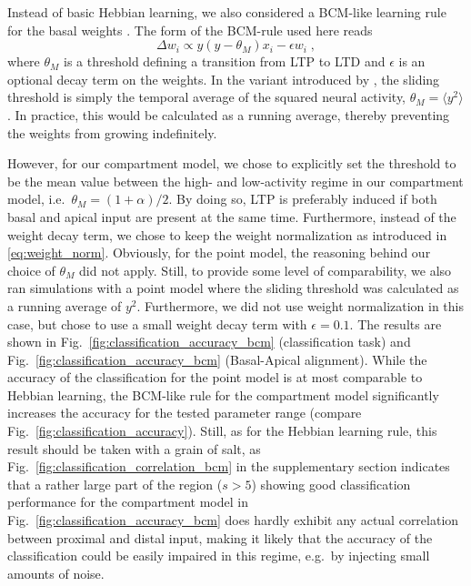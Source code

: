 \documentclass[utf8]{frontiersSCNS} %
\begin{document}
Instead of basic Hebbian learning, we also considered 
a BCM-like learning rule for the basal weights 
\citep{Bienenstock1982,Intrator1992}.
The form of the BCM-rule used here reads
\begin{equation}
\Delta w_i \propto y\left(y - \theta_M\right) x_i - 
\epsilon w_i \; , \label{eq:bcm_rule}
\end{equation}
where $\theta_M$ is a threshold defining a transition from LTP to LTD and
$\epsilon$ is an optional decay term on the weights.
In the variant introduced by \citet{Law1994}, the sliding threshold is simply
the temporal average of the squared neural activity, 
$\theta_M = \langle y^2 \rangle$. In practice, this would be calculated
as a running average, thereby preventing the weights from growing 
indefinitely.

However, for our compartment model, we chose to explicitly set the
threshold to be the mean value between the high- and low-activity regime
in our compartment model, i.e.\ $\theta_M = (1+\alpha)/2$. By doing so, LTP is
preferably induced if both basal and apical input are present at the same
time. Furthermore, instead of the weight decay term, we chose to keep
the weight normalization as introduced in \eqref{eq:weight_norm}.
Obviously, for the point model, the reasoning behind our choice of
$\theta_M$ did not apply. Still, to provide some level of comparability,
we also ran simulations with a point model where the sliding threshold was
calculated as a running average of $y^2$. Furthermore, we did not use
weight normalization in this case, but chose to use a small weight decay term
with $\epsilon = 0.1$. The results are shown in 
Fig.~\ref{fig:classification_accuracy_bcm} (classification task) and 
Fig.~\ref{fig:classification_accuracy_bcm} (Basal-Apical alignment). 
While the accuracy of the classification for the point model
is at most comparable to Hebbian learning, the BCM-like rule for the 
compartment model significantly increases the accuracy for the tested
parameter range (compare Fig.~\ref{fig:classification_accuracy}). 
Still, as for the Hebbian learning rule, this result should be taken
with a grain of salt, as Fig.~\ref{fig:classification_correlation_bcm}
in the supplementary section indicates that a rather large part of 
the region ($s>5$) showing good
classification performance for the compartment model in 
Fig.~\ref{fig:classification_accuracy_bcm} does hardly exhibit any actual
correlation between proximal and distal input, making it likely that
the accuracy of the classification could be easily impaired in this regime, 
e.g.\ by injecting small amounts of noise.
\end{document}
